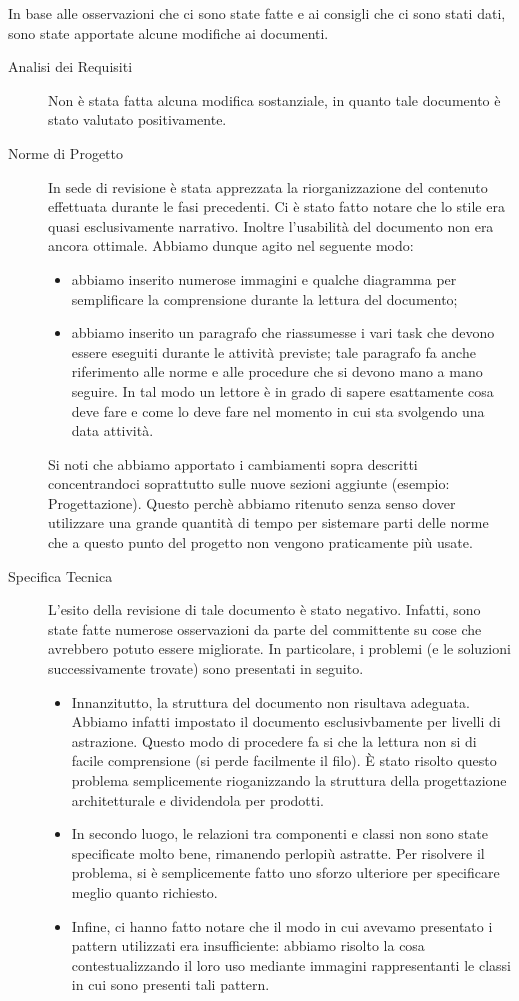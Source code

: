 		In base alle osservazioni che ci sono state fatte e ai consigli che ci sono stati dati, sono state apportate alcune modifiche ai documenti.
		\begin{description}
			\item[Analisi dei Requisiti] Non è stata fatta alcuna modifica sostanziale, in quanto tale documento è stato valutato positivamente.
			\item[Norme di Progetto] In sede di revisione è stata apprezzata la riorganizzazione del contenuto effettuata durante le fasi precedenti. Ci è stato fatto notare che lo stile era quasi esclusivamente narrativo. Inoltre l'usabilità del documento non era ancora ottimale. Abbiamo dunque agito nel seguente modo:
			\begin{itemize}
				\item abbiamo inserito numerose immagini e qualche diagramma per semplificare la comprensione durante la lettura del documento;
				\item abbiamo inserito un paragrafo che riassumesse i vari task che devono essere eseguiti durante le attività previste; tale paragrafo fa anche riferimento alle norme e alle procedure che si devono mano a mano seguire. In tal modo un lettore è in grado di sapere esattamente cosa deve fare e come lo deve fare nel momento in cui sta svolgendo una data attività.
			\end{itemize}
			Si noti che abbiamo apportato i cambiamenti sopra descritti concentrandoci soprattutto sulle nuove sezioni aggiunte (esempio: Progettazione). Questo perchè abbiamo ritenuto senza senso dover utilizzare una grande quantità di tempo per sistemare parti delle norme che a questo punto del progetto non vengono praticamente più usate.
			\item[Specifica Tecnica] L'esito della revisione di tale documento è stato negativo. Infatti, sono state fatte numerose osservazioni da parte del committente su cose che avrebbero potuto essere migliorate. In particolare, i problemi (e le soluzioni successivamente trovate) sono presentati in seguito.
			\begin{itemize}
				\item Innanzitutto, la struttura del documento non risultava adeguata. Abbiamo infatti impostato il documento esclusivbamente per livelli di astrazione. Questo modo di procedere fa si che la lettura non si di facile comprensione (si perde facilmente il filo). È stato risolto questo problema semplicemente rioganizzando la struttura della progettazione architetturale e dividendola per prodotti.
				\item In secondo luogo, le relazioni tra componenti e classi non sono state specificate molto bene, rimanendo perlopiù astratte. Per risolvere il problema, si è semplicemente fatto uno sforzo ulteriore per specificare meglio quanto richiesto.
				\item Infine, ci hanno fatto notare che il modo in cui avevamo presentato i pattern utilizzati era insufficiente: abbiamo risolto la cosa contestualizzando il loro uso mediante immagini rappresentanti le classi in cui sono presenti tali pattern.
			\end{itemize}
		\end{description}